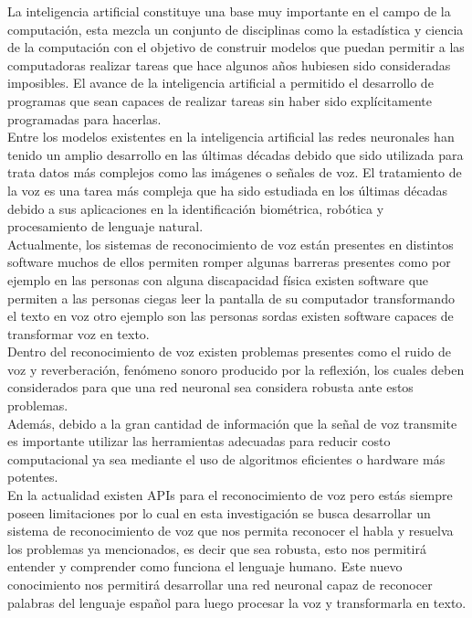 La inteligencia artificial constituye una base muy importante en el campo de la computación, esta mezcla un conjunto de disciplinas como la estadística y ciencia de la computación con el objetivo de construir modelos que puedan permitir a las computadoras realizar tareas que hace algunos años hubiesen sido consideradas imposibles. El avance de la inteligencia artificial a permitido el desarrollo de programas que sean capaces de realizar tareas sin haber sido explícitamente programadas para hacerlas.\\
Entre los modelos existentes en la inteligencia artificial las redes neuronales han tenido un amplio desarrollo en las últimas décadas debido que sido utilizada para trata datos más complejos como las imágenes o señales de voz. El tratamiento de la voz es una tarea más compleja que ha sido estudiada en los últimas décadas debido a sus aplicaciones en la identificación biométrica, robótica y procesamiento de lenguaje natural.\\
Actualmente, los sistemas de reconocimiento de voz están presentes en distintos software muchos de ellos permiten romper algunas barreras presentes como por ejemplo en las personas con alguna discapacidad física existen software que permiten a las personas ciegas leer la pantalla de su computador transformando el texto en voz otro ejemplo son las personas sordas existen software capaces de transformar voz en texto.\\
Dentro del reconocimiento de voz existen problemas presentes como el ruido de voz y reverberación, fenómeno sonoro producido por la reflexión,  los cuales deben considerados para que una red neuronal sea considera robusta ante estos problemas.\\ Además, debido a la gran cantidad de información que la señal de voz transmite es importante utilizar las herramientas adecuadas para reducir costo computacional ya sea mediante el uso de algoritmos eficientes o hardware más potentes.\\
En la actualidad existen APIs para el reconocimiento de voz pero estás siempre poseen limitaciones por lo cual en esta investigación se busca desarrollar un sistema de reconocimiento de voz que nos permita reconocer el habla y resuelva los problemas ya mencionados, es decir que sea robusta, esto nos permitirá entender y comprender como funciona el lenguaje humano. Este nuevo conocimiento nos permitirá desarrollar una red neuronal capaz de reconocer palabras del lenguaje español para luego procesar la voz y transformarla en texto.

